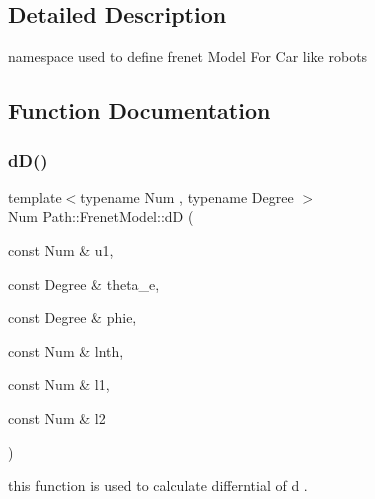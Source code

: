 \subsection{Detailed Description}
namespace used to define frenet Model For Car like robots 



\subsection{Function Documentation}
\mbox{\label{namespace_path_1_1_frenet_model_ad4b6f15d18cda83a0b49196c7e4c39a7}} 
\subsubsection{\texorpdfstring{d\+D()}{dD()}}
{\footnotesize\ttfamily template$<$typename Num , typename Degree $>$ \\
Num Path\+::\+Frenet\+Model\+::dD (\begin{DoxyParamCaption}\item[{const Num \&}]{u1,  }\item[{const Degree \&}]{theta\+\_\+e,  }\item[{const Degree \&}]{phie,  }\item[{const Num \&}]{lnth,  }\item[{const Num \&}]{l1,  }\item[{const Num \&}]{l2 }\end{DoxyParamCaption})}



this function is used to calculate differntial of d . 

